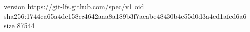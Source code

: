 version https://git-lfs.github.com/spec/v1
oid sha256:1744ca65a4dc158cc4642aaa8a189b3f7aeabe48430b4c55d0d3a4ed1afcd6a6
size 87544
